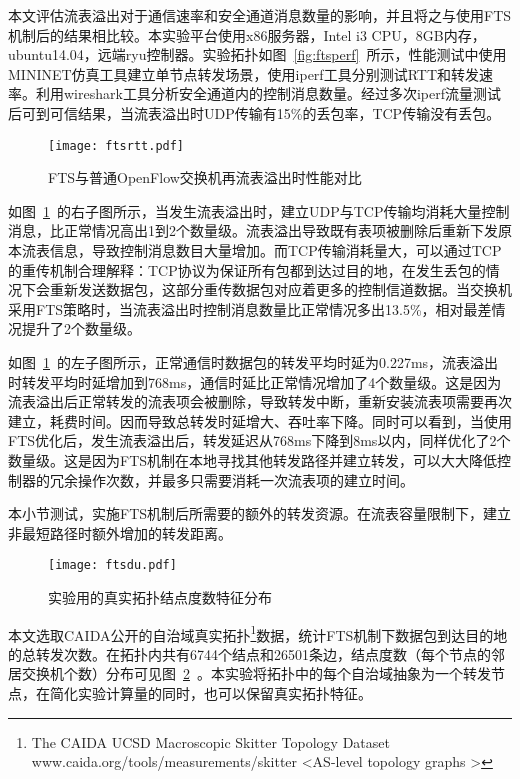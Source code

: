 本文评估流表溢出对于通信速率和安全通道消息数量的影响，并且将之与使用FTS机制后的结果相比较。本实验平台使用x86服务器，Intel i3 CPU，8GB内存，ubuntu14.04，远端ryu控制器。实验拓扑如图~\ref{fig:ftsperf}~所示，性能测试中使用MININET仿真工具建立单节点转发场景，使用iperf工具分别测试RTT和转发速率。利用wireshark工具分析安全通道内的控制消息数量。经过多次iperf流量测试后可到可信结果，当流表溢出时UDP传输有15\%的丢包率，TCP传输没有丢包。

\begin{figure}[!ht]
	\centering 
	\vspace{-1.5mm} 
	\texttt{[image: ftsrtt.pdf]}
	\caption{FTS与普通OpenFlow交换机再流表溢出时性能对比} \label{fig:ftsrtt}
\end{figure}

如图~\ref{fig:ftsrtt}~的右子图所示，当发生流表溢出时，建立UDP与TCP传输均消耗大量控制消息，比正常情况高出1到2个数量级。流表溢出导致既有表项被删除后重新下发原本流表信息，导致控制消息数目大量增加。而TCP传输消耗量大，可以通过TCP 的重传机制合理解释：TCP协议为保证所有包都到达过目的地，在发生丢包的情况下会重新发送数据包，这部分重传数据包对应着更多的控制信道数据。当交换机采用FTS策略时，当流表溢出时控制消息数量比正常情况多出13.5\%，相对最差情况提升了2个数量级。

如图~\ref{fig:ftsrtt}~的左子图所示，正常通信时数据包的转发平均时延为0.227ms，流表溢出时转发平均时延增加到768ms，通信时延比正常情况增加了4个数量级。这是因为流表溢出后正常转发的流表项会被删除，导致转发中断，重新安装流表项需要再次建立，耗费时间。因而导致总转发时延增大、吞吐率下降。同时可以看到，当使用FTS优化后，发生流表溢出后，转发延迟从768ms下降到8ms以内，同样优化了2个数量级。这是因为FTS机制在本地寻找其他转发路径并建立转发，可以大大降低控制器的冗余操作次数，并最多只需要消耗一次流表项的建立时间。


本小节测试，实施FTS机制后所需要的额外的转发资源。在流表容量限制下，建立非最短路径时额外增加的转发距离。

\begin{figure}[!ht]
	\centering 
	\vspace{-1.5mm} 
	\texttt{[image: ftsdu.pdf]}
	\caption{实验用的真实拓扑结点度数特征分布} \label{fig:ftsdu}
\end{figure}

本文选取CAIDA公开的自治域真实拓扑\footnote{The CAIDA UCSD Macroscopic Skitter Topology Dataset  www.caida.org/tools/measurements/skitter <AS-level topology graphs > }数据，统计FTS机制下数据包到达目的地的总转发次数。在拓扑内共有6744个结点和26501条边，结点度数（每个节点的邻居交换机个数）分布可见图~\ref{fig:ftsdu}~。本实验将拓扑中的每个自治域抽象为一个转发节点，在简化实验计算量的同时，也可以保留真实拓扑特征。

